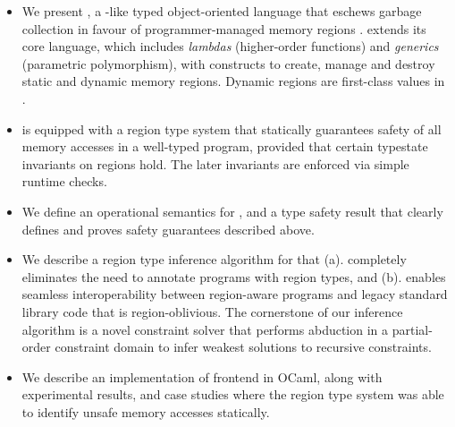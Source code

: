 \begin{itemize} \item We present \name, a \csharp-like typed
object-oriented language that eschews garbage collection in favour of
programmer-managed memory regions . \name extends its core language,
which includes \emph{lambdas} (higher-order functions) and
\emph{generics} (parametric polymorphism), with constructs to create,
manage and destroy static and dynamic memory regions. Dynamic regions
are first-class values in \name.

  \item \name is equipped with a region type system that statically
  guarantees safety of all memory accesses in a well-typed program,
  provided that certain typestate invariants on regions hold.  The
  later invariants are enforced via simple runtime checks.

  \item We define an operational semantics for \name, and a type
  safety result that clearly defines and proves safety guarantees
  described above.

  \item We describe a region type inference algorithm for \name that
  (a). completely eliminates the need to annotate \name programs with
  region types, and (b). enables seamless interoperability between
  region-aware \name programs and legacy standard library code that is
  region-oblivious. The cornerstone of our inference algorithm is a
  novel constraint solver that performs abduction in a partial-order
  constraint domain to infer weakest solutions to recursive
  constraints.

  \item We describe an implementation of \name frontend in OCaml,
  along with experimental results,  and case studies where the region
  type system was able to identify unsafe memory accesses statically.
  
\end{itemize}

